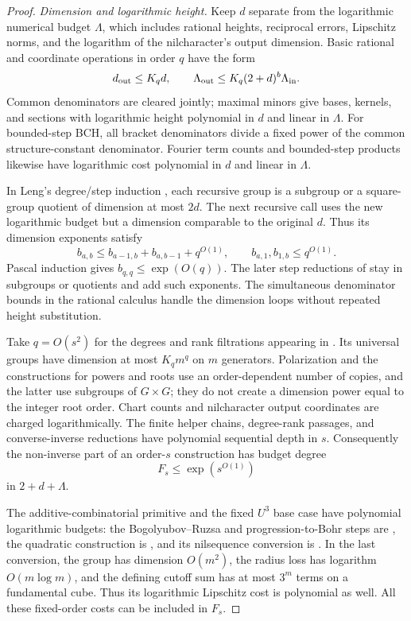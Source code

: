\documentclass[11pt,a4paper]{article}
\theoremstyle{definition}
\begin{document}
\begin{proof}
\textit{Dimension and logarithmic height.}
Keep \(d\) separate from the logarithmic numerical budget
\(\Lambda\), which includes rational heights, reciprocal
errors, Lipschitz norms, and the logarithm of the
nilcharacter's output dimension. Basic rational and
coordinate operations in order \(q\) have the form
\begin{equation}\label{eq:height}
 d_{\rm out}\le K_qd,\qquad
 \Lambda_{\rm out}\le K_q(2+d)^b\Lambda_{\rm in}.
\end{equation}
Common denominators are cleared jointly; maximal minors
give bases, kernels, and sections with logarithmic height
polynomial in \(d\) and linear in \(\Lambda\).
For bounded-step BCH, all bracket denominators divide a
fixed power of the common structure-constant denominator.
Fourier term counts and bounded-step products likewise
have logarithmic cost polynomial in \(d\) and linear in
\(\Lambda\).

In Leng's degree/step induction \cite{leng}, each recursive
group is a subgroup or a square-group quotient of
dimension at most \(2d\). The next recursive call uses the
new logarithmic budget but a dimension comparable to the
original \(d\). Thus its dimension exponents satisfy
\[
 b_{a,b}\le b_{a-1,b}+b_{a,b-1}+q^{O(1)},
 \qquad b_{a,1},b_{1,b}\le q^{O(1)}.
\]
Pascal induction gives \(b_{q,q}\le\exp(O(q))\).
The later step reductions of \cite[Theorem 5.4]{lss}
stay in subgroups or quotients and add such exponents.
The simultaneous denominator bounds in the rational
calculus handle the dimension loops without repeated
height substitution.

Take \(q=O(s^2)\) for the degrees and rank filtrations
appearing in \cite{lss}. Its universal groups have
dimension at most \(K_qm^q\) on \(m\) generators.
Polarization and the constructions for powers and roots
use an order-dependent number of copies, and the latter
use subgroups of \(G\times G\); they do not create a
dimension power equal to the integer root order.
Chart counts and nilcharacter output coordinates are
charged logarithmically. The finite helper chains,
degree-rank passages, and converse-inverse reductions
have polynomial sequential depth in \(s\). Consequently
the non-inverse part of an order-\(s\) construction has
budget degree
\begin{equation}\label{eq:Fs}
 F_s\le\exp(s^{O(1)})
\end{equation}
in \(2+d+\Lambda\).

The additive-combinatorial primitive and the fixed \(U^3\)
base case have polynomial logarithmic budgets: the
Bogolyubov--Ruzsa and progression-to-Bohr steps are
\cite{sanders,milicevic}, the quadratic construction is
\cite[Appendix A]{lengquadratic}, and its nilsequence
conversion is \cite{jamneshan}. In the last conversion,
the group has dimension \(O(m^2)\), the radius loss has
logarithm \(O(m\log m)\), and the defining cutoff sum
has at most \(3^m\) terms on a fundamental cube. Thus
its logarithmic Lipschitz cost is polynomial as well.
All these fixed-order costs can be included in \(F_s\).


\end{proof}
\end{document}
